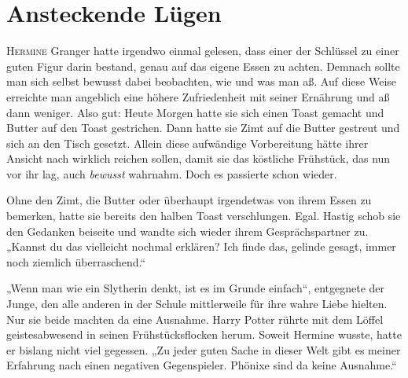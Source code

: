\chapter{Ansteckende Lügen}

\lettrine{H}{ermine} Granger hatte irgendwo einmal gelesen, dass einer der Schlüssel zu einer guten Figur darin bestand, genau auf das eigene Essen zu achten. Demnach sollte man sich selbst bewusst dabei beobachten, wie und was man aß. Auf diese Weise erreichte man angeblich eine höhere Zufriedenheit mit seiner Ernährung und aß dann weniger.
Also gut: Heute Morgen hatte sie sich einen Toast gemacht und Butter auf den Toast gestrichen. Dann hatte sie Zimt auf die Butter gestreut und sich an den Tisch gesetzt. Allein diese aufwändige Vorbereitung hätte ihrer Ansicht nach wirklich reichen sollen, damit sie das köstliche Frühstück, das nun vor ihr lag, auch \emph{bewusst} wahrnahm. Doch es passierte schon wieder.

Ohne den Zimt, die Butter oder überhaupt irgendetwas von ihrem Essen zu bemerken, hatte sie bereits den halben Toast verschlungen. Egal. Hastig schob sie den Gedanken beiseite und wandte sich wieder ihrem Gesprächspartner zu. „Kannst du das vielleicht nochmal erklären? Ich finde das, gelinde gesagt, immer noch ziemlich überraschend.“

„Wenn man wie ein Slytherin denkt, ist es im Grunde einfach“, entgegnete der Junge, den alle anderen in der Schule mittlerweile für ihre wahre Liebe hielten. Nur sie beide machten da eine Ausnahme. Harry Potter rührte mit dem Löffel geistesabwesend in seinen Frühstücksflocken herum. Soweit Hermine wusste, hatte er bislang nicht viel gegessen. „Zu jeder guten Sache in dieser Welt gibt es meiner Erfahrung nach einen negativen Gegenspieler. Phönixe sind da keine Ausnahme.“


